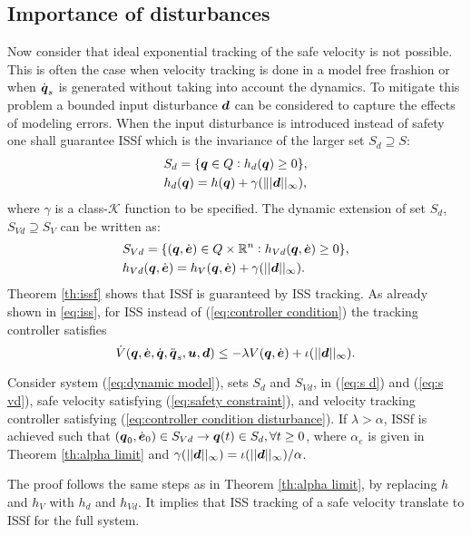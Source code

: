 \subsection{Importance of disturbances}
Now consider that ideal exponential tracking of the safe velocity is not possible. This is often the case when velocity tracking is done in a model free frashion or when $\dot{\boldsymbol{q}}_s$ is generated without taking into account the dynamics. To mitigate this problem a bounded input disturbance $\boldsymbol{d}$ can be considered to capture the effects of modeling errors. When the input disturbance is introduced instead of safety one shall guarantee ISSf which is the invariance of the larger set $S_d \supseteq S$:
\begin{equation} \label{eq:s d}
    \begin{split}
        &S_d = \{{\boldsymbol{q}} \in Q: h_d({\boldsymbol{q}})\geq 0 \},\\
        &h_d({\boldsymbol{q}})=h({\boldsymbol{q}}) + \gamma(\||\boldsymbol{d}||_\infty  ),
    \end{split}
\end{equation}
where $\gamma$ is a class-$\mathcal{K}$ function to be specified. 
The dynamic extension of set $S_d$, $S_{Vd}\supseteq S_{V}$ can be written as:
\begin{equation} \label{eq:s vd}
    \begin{split}
        &S_{Vd} = \{({\boldsymbol{q}},\dot{\boldsymbol{e}})\in Q \times \mathbb{R}^n: h_{Vd}({\boldsymbol{q}},\dot{\boldsymbol{e}})\geq 0\},\\
        &h_{Vd}({\boldsymbol{q}},\dot{\boldsymbol{e}}) = h_V({\boldsymbol{q}},\dot{\boldsymbol{e}})+\gamma(||\boldsymbol{d}||_\infty).
    \end{split}
\end{equation}
Theorem \ref{th:issf} shows that ISSf is guaranteed by ISS tracking. %
As already shown in \eqref{eq:iss}, for ISS instead of (\ref{eq:controller condition}) the tracking controller satisfies
\begin{equation} \label{eq:controller condition disturbance}
    \dot{V}({\boldsymbol{q}},\dot{\boldsymbol{e}},\dot{{\boldsymbol{q}}},\ddot{{\boldsymbol{q}}}_s,\boldsymbol{u},\boldsymbol{d}) \leq -\lambda V({\boldsymbol{q}},\dot{\boldsymbol{e}}) + \iota(||\boldsymbol{d}||_{\infty}).
\end{equation}
\begin{theorem}\label{th:issf}
    Consider system (\ref{eq:dynamic model}), sets $S_d$ and $S_{Vd}$, in (\ref{eq:s d}) and (\ref{eq:s vd}), safe velocity satisfying (\ref{eq:safety constraint}), and velocity tracking controller satisfying (\ref{eq:controller condition disturbance}). If $\lambda > \alpha$, ISSf is achieved such that $({\boldsymbol{q}}_0,\dot{\boldsymbol{e}}_0) \in S_{Vd} \rightarrow {\boldsymbol{q}}(t) \in S_d, \forall t \geq 0$, where $\alpha_e$ is given in Theorem \ref{th:alpha limit} and $\gamma(||\boldsymbol{d}||_\infty)=\iota(||\boldsymbol{d}||_\infty)/\alpha$.
\end{theorem}
\noindent
The proof follows the same steps as in Theorem \ref{th:alpha limit}, by replacing $h$ and $h_V$ with $h_d$ and $h_{Vd}$. It implies that ISS tracking of a safe velocity translate to ISSf for the full system.
